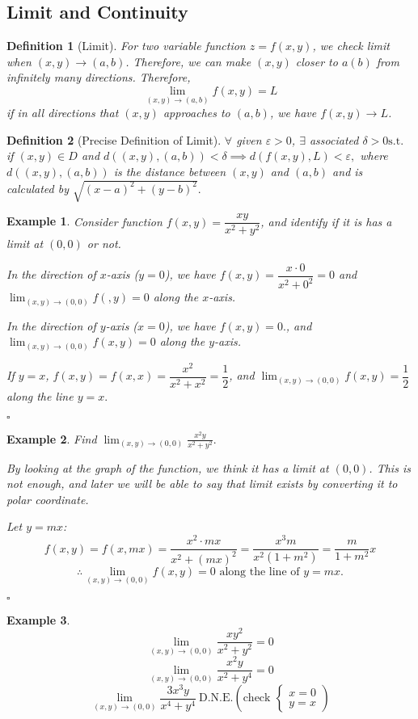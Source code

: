 \documentclass[12pt,a4paper]{article}
\newtheorem{df}{Definition}[subsection]
\newtheorem{eg}{Example}[subsection]
\newenvironment*{ans}{\par\indent{\textit{Answer. }}\par}{\par\hfill{$\square$}\par}
\def\DNE{\mathrm{D.N.E.}}
\def\st{\mathrm{ s.t. }}
\begin{document}
\subsection{Limit and Continuity}
\begin{df}[Limit]
	For two variable function $z=f(x,y)$, we check limit when $(x,y)\to(a,b)$. Therefore, we can make $(x,y)$ closer to $a(b)$ from infinitely many directions. Therefore, \[\lim_{(x,y)\to(a,b)}f(x,y)=L\] if in all directions that $(x,y)$ approaches to $(a,b)$, we have $f(x,y)\to L$.	
\end{df}
\begin{df}[Precise Definition of Limit]
	$\forall$ given $\varepsilon>0$, $\exists$ associated $\delta>0\st$ if $(x,y)\in D$ and $d((x,y),(a,b))<\delta\implies d(f(x,y),L)<\varepsilon,$ where $d((x,y),(a,b))$ is the distance between $(x,y)$ and $(a,b)$ and is calculated by $\sqrt{(x-a)^2+(y-b)^2}.$
\end{df}
\begin{eg}
	Consider function $f(x,y)=\dfrac{xy}{x^2+y^2}$, and identify if it is has a limit at $(0,0)$ or not. 
	\begin{ans}
		In the direction of $x$-axis ($y=0$), we have $f(x,y)=\dfrac{x\cdot0}{x^2+0^2}=0$ and $\displaystyle\lim_{(x,y)\to(0,0)}f(,y)=0$ along the $x$-axis.\par In the direction of $y$-axis ($x=0$), we have $f(x,y)=0.$, and $\displaystyle\lim_{(x,y)\to(0,0)}f(x,y)=0$ along the $y$-axis.\par If $y=x$, $f(x,y)=f(x,x)=\dfrac{x^2}{x^2+x^2}=\dfrac{1}{2}$, and $\displaystyle\lim_{(x,y)\to(0,0)}f(x,y)=\dfrac{1}{2}$ along the line $y=x.$
	\end{ans}
\end{eg}
\begin{eg}
	Find $\displaystyle\lim_{(x,y)\to(0,0)}\frac{x^2y}{x^2+y^2}.$
	\begin{ans}
		By looking at the graph of the function, we think it has a limit at $(0,0)$. This is not enough, and later we will be able to say that limit exists by converting it to polar coordinate.\par Let $y=mx$: \[f(x,y)=f(x,mx)=\frac{x^2\cdot mx}{x^2+(mx)^2}=\frac{x^3m}{x^2(1+m^2)}=\frac{m}{1+m^2}x\]\[\therefore\lim_{(x,y)\to(0,0)}f(x,y)=0\text{ along the line of }y=mx.\]
	\end{ans}
\end{eg}
\begin{eg}
	\[\lim_{(x,y)\to(0,0)}\frac{xy^2}{x^2+y^2}=0\]	
	\[\lim_{(x,y)\to(0,0)}\frac{x^2y}{x^2+y^4}=0\]
	\[\lim_{(x,y)\to(0,0)}\frac{3x^3y}{x^4+y^4}\ \DNE \left(\text{check }\begin{cases}x=0\\y=x\end{cases}\right)\]
\end{eg}
\end{document}
